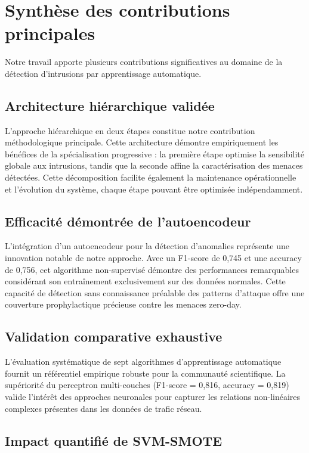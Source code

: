\section{Synthèse des contributions principales}

Notre travail apporte plusieurs contributions significatives au domaine de la détection d'intrusions par apprentissage automatique.

\subsection{Architecture hiérarchique validée}

L'approche hiérarchique en deux étapes constitue notre contribution méthodologique principale. Cette architecture démontre empiriquement les bénéfices de la spécialisation progressive : la première étape optimise la sensibilité globale aux intrusions, tandis que la seconde affine la caractérisation des menaces détectées. Cette décomposition facilite également la maintenance opérationnelle et l'évolution du système, chaque étape pouvant être optimisée indépendamment.

\subsection{Efficacité démontrée de l'autoencodeur}

L'intégration d'un autoencodeur pour la détection d'anomalies représente une innovation notable de notre approche. Avec un F1-score de 0,745 et une accuracy de 0,756, cet algorithme non-supervisé démontre des performances remarquables considérant son entraînement exclusivement sur des données normales. Cette capacité de détection sans connaissance préalable des patterns d'attaque offre une couverture prophylactique précieuse contre les menaces zero-day.

\subsection{Validation comparative exhaustive}

L'évaluation systématique de sept algorithmes d'apprentissage automatique fournit un référentiel empirique robuste pour la communauté scientifique. La supériorité du perceptron multi-couches (F1-score = 0,816, accuracy = 0,819) valide l'intérêt des approches neuronales pour capturer les relations non-linéaires complexes présentes dans les données de trafic réseau.

\subsection{Impact quantifié de SVM-SMOTE}

